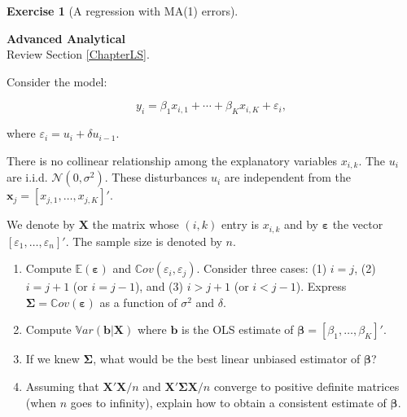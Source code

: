 \documentclass[
  11pt,
]{book}
\theoremstyle{definition}
\theoremstyle{definition}
\theoremstyle{definition}
\newtheorem{exercise}{Exercise}[chapter]
\theoremstyle{definition}
\theoremstyle{remark}
\begin{document}

\begin{exercisebox}

\begin{exercise}[A regression with MA(1) errors]
\protect\hypertarget{exr:regressions-serial-correlation}{}\label{exr:regressions-serial-correlation}

\textbf{Advanced \textbar{} Analytical}\\
Review Section \ref{ChapterLS}.

Consider the model:

\[y_i = \beta_1 x_{i,1} + \cdots + \beta_K x_{i,K} + \varepsilon_i,\]

where \(\varepsilon_i = u_i + \delta u_{i-1}\).

There is no collinear relationship among the explanatory variables \(x_{i,k}\). The \(u_i\) are i.i.d. \(\mathcal{N}(0, \sigma^2)\). These disturbances \(u_i\) are independent from the \(\mathbf{x}_j = [x_{j,1},\dots,x_{j,K}]'\).

We denote by \(\mathbf{X}\) the matrix whose \((i,k)\) entry is \(x_{i,k}\) and by \(\boldsymbol{\varepsilon}\) the vector \([\varepsilon_1,\dots,\varepsilon_n]'\). The sample size is denoted by \(n\).

\begin{enumerate}
\def\labelenumi{\arabic{enumi}.}
\item
  Compute \(\mathbb{E}(\boldsymbol{\varepsilon})\) and \(\mathbb{C}ov(\varepsilon_i, \varepsilon_j)\). Consider three cases: (1) \(i = j\), (2) \(i = j+1\) (or \(i = j-1\)), and (3) \(i > j+1\) (or \(i < j-1\)). Express \(\mathbf{\Sigma} = \mathbb{C}ov(\boldsymbol{\varepsilon})\) as a function of \(\sigma^2\) and \(\delta\).
\item
  Compute \(\mathbb{V}ar(\mathbf{b} | \mathbf{X})\) where \(\mathbf{b}\) is the OLS estimate of \(\boldsymbol{\beta} = [\beta_1, \dots, \beta_K]'\).
\item
  If we knew \(\mathbf{\Sigma}\), what would be the best linear unbiased estimator of \(\boldsymbol\beta\)?
\item
  Assuming that \(\mathbf{X'X}/n\) and \(\mathbf{X'\Sigma X}/n\) converge to positive definite matrices (when \(n\) goes to infinity), explain how to obtain a consistent estimate of \(\boldsymbol{\beta}\).
\end{enumerate}

\end{exercise}

\end{exercisebox}
\end{document}
